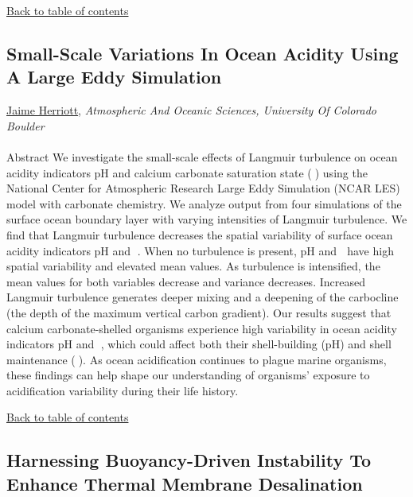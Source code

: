 \begin{flushright}\vspace{-0.2 in}\hyperlink{toc}{Back to table of contents}\end{flushright}\vspace{-0.2 in}
\hypertarget{JaimeHerriott}{\subsection*{\color{CUGOLD} Small-Scale Variations In Ocean Acidity Using A Large Eddy Simulation}} \vsp 
\underline{Jaime Herriott}, \textit{Atmospheric And Oceanic Sciences, University Of Colorado Boulder}\\ 
\vspace{-0.1 in} \\ 
\noindent Abstract We investigate the small-scale effects of Langmuir turbulence on ocean acidity indicators pH and calcium carbonate saturation state () using the National Center for Atmospheric Research Large Eddy Simulation (NCAR LES) model with carbonate chemistry.  We analyze output from four simulations of the surface ocean boundary layer with varying intensities of Langmuir turbulence.  We find that Langmuir turbulence decreases the spatial variability of surface ocean acidity indicators pH and .  When no turbulence is present, pH and  have high spatial variability and elevated mean values.  As turbulence is intensified, the mean values for both variables decrease and variance decreases.  Increased Langmuir turbulence generates deeper mixing and a deepening of the carbocline (the depth of the maximum vertical carbon gradient).  Our results suggest that calcium carbonate-shelled organisms experience high variability in ocean acidity indicators pH and , which could affect both their shell-building (pH) and shell maintenance ().  As ocean acidification continues to plague marine organisms, these findings can help shape our understanding of organisms’ exposure to acidification variability during their life history.   \\ 
\begin{flushright}\vspace{-0.2 in}\hyperlink{toc}{Back to table of contents}\end{flushright}\vspace{-0.2 in}
\hypertarget{FedericoMunicchi}{\subsection*{\color{CUGOLD} Harnessing Buoyancy-Driven Instability To Enhance Thermal Membrane Desalination}} \vsp 
